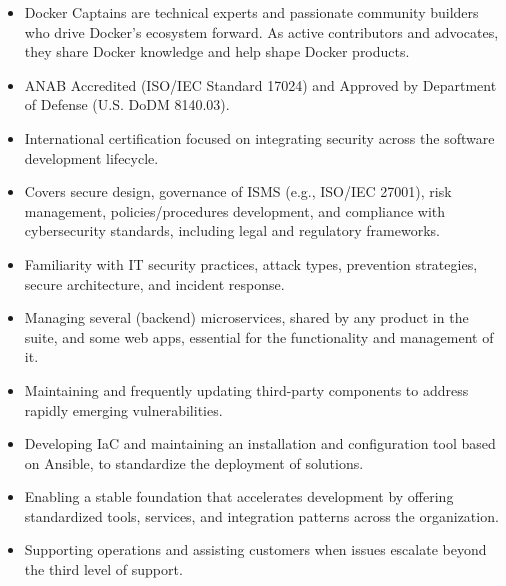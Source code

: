 \iflongversion
	\begin{itemize}
		\item Docker Captains are technical experts and passionate community builders who drive Docker’s ecosystem forward. As active contributors and advocates, they share Docker knowledge and help shape Docker products.
	\end{itemize}

	\begin{itemize}
		\item ANAB Accredited (ISO/IEC Standard 17024) and Approved by Department of Defense (U.S. DoDM 8140.03).
		\item International certification focused on integrating security across the software development lifecycle. 
		\item Covers secure design, governance of ISMS (e.g., ISO/IEC 27001), risk management, policies/procedures development, and compliance with cybersecurity standards, including legal and regulatory frameworks.
		\item Familiarity with IT security practices, attack types, prevention strategies, secure architecture, and incident response.
	\end{itemize}
\fi


\iflongversion
	\begin{itemize}
		\item Managing several (backend) microservices, shared by any product in the suite, and some web apps, essential for the functionality and management of it.
		\item Maintaining and frequently updating third-party components to address rapidly emerging vulnerabilities.
		\item  Developing IaC and maintaining an installation and configuration tool based on Ansible, to standardize the deployment of solutions.
		\item Enabling a stable foundation that accelerates development by offering standardized tools, services, and integration patterns across the organization.
		\item Supporting operations and assisting customers when issues escalate beyond the third level of support.
	\end{itemize}
	\smallskip

